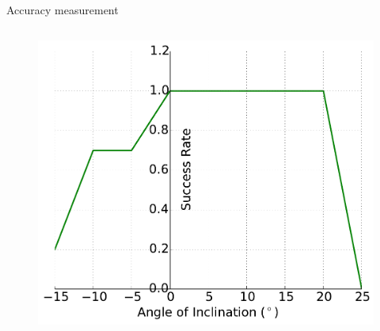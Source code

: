 \documentclass[aspectratio=43,11pt,xcolor={dvipsnames}]{beamer}
\begin{document}
\begin{frame}{Accuracy measurement}
\begin{columns}[t]
		\begin{column}{0.5\textwidth}
			\begin{figure}
				\includegraphics[width=\textwidth]{success_rate}
			\end{figure}
		\end{column}
	\end{columns}
\end{frame}

%
%
\end{document}
